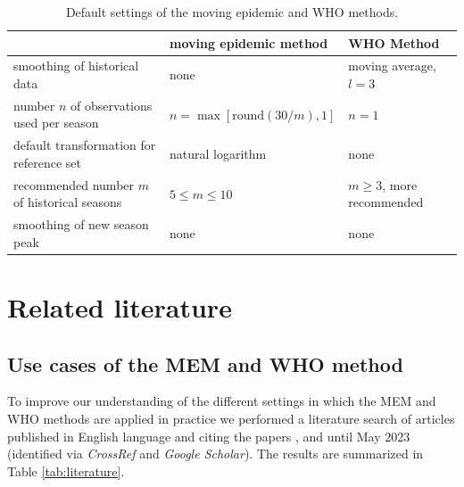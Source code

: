 \documentclass[12pt]{article}
\begin{document}
\begin{table}[h]
\caption{Default settings of the moving epidemic and WHO methods.}
\label{tab:differences}
\begin{center}
\footnotesize
\begin{tabular}{lll}
\toprule
& moving epidemic method & WHO Method \\
\midrule
smoothing of historical data & none & moving average, $l = 3$\\
number $n$ of observations used per season & $n = \max[\text{round}(30/m), 1]$ & $n = 1$\\
default transformation for reference set & natural logarithm & none\\
recommended number $m$ of historical seasons & $5 \leq m \leq 10$ & $m \geq 3$, more recommended\\
smoothing of new season peak & none & none\\
\bottomrule
\end{tabular}
\end{center}

\end{table}





\section{Related literature}
\label{sec:review}

\subsection{Use cases of the MEM and WHO method}


To improve our understanding of the different settings in which the MEM and WHO methods are applied in practice we performed a literature search of articles published in English language and citing the papers \cite{Vega2015}, \cite{WHO2014} and \cite{WHO2017} until May 2023 (identified via \textit{CrossRef} and \textit{Google Scholar}). The results are summarized in Table \ref{tab:literature}.
\end{document}
